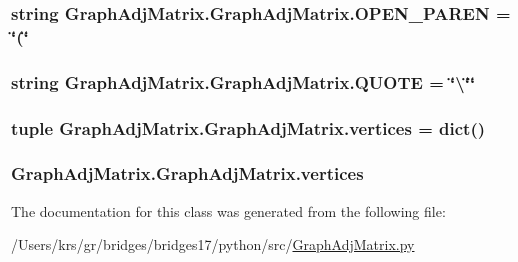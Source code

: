 \subsubsection[{O\+P\+E\+N\+\_\+\+P\+A\+R\+E\+N}]{\setlength{\rightskip}{0pt plus 5cm}string Graph\+Adj\+Matrix.\+Graph\+Adj\+Matrix.\+O\+P\+E\+N\+\_\+\+P\+A\+R\+E\+N = \char`\"{}(\char`\"{}\hspace{0.3cm}{\ttfamily [static]}}\label{class_graph_adj_matrix_1_1_graph_adj_matrix_a0eb8509351b0db9469c5fffe5eddb898}
\hypertarget{class_graph_adj_matrix_1_1_graph_adj_matrix_acd4760c3ebf6789b9f8b1ec13d5394ee}{}
\subsubsection[{Q\+U\+O\+T\+E}]{\setlength{\rightskip}{0pt plus 5cm}string Graph\+Adj\+Matrix.\+Graph\+Adj\+Matrix.\+Q\+U\+O\+T\+E = \char`\"{}\textbackslash{}\char`\"{}\char`\"{}\hspace{0.3cm}{\ttfamily [static]}}\label{class_graph_adj_matrix_1_1_graph_adj_matrix_acd4760c3ebf6789b9f8b1ec13d5394ee}
\hypertarget{class_graph_adj_matrix_1_1_graph_adj_matrix_ab02c8991e3ec38d4f1d277b350fbce4f}{}
\subsubsection[{vertices}]{\setlength{\rightskip}{0pt plus 5cm}tuple Graph\+Adj\+Matrix.\+Graph\+Adj\+Matrix.\+vertices = dict()\hspace{0.3cm}{\ttfamily [static]}}\label{class_graph_adj_matrix_1_1_graph_adj_matrix_ab02c8991e3ec38d4f1d277b350fbce4f}
\hypertarget{class_graph_adj_matrix_1_1_graph_adj_matrix_a85c454d09e82706b00563af339c0147f}{}
\subsubsection[{vertices}]{\setlength{\rightskip}{0pt plus 5cm}Graph\+Adj\+Matrix.\+Graph\+Adj\+Matrix.\+vertices}\label{class_graph_adj_matrix_1_1_graph_adj_matrix_a85c454d09e82706b00563af339c0147f}


The documentation for this class was generated from the following file\+:\begin{DoxyCompactItemize}
\item 
/\+Users/krs/gr/bridges/bridges17/python/src/\hyperlink{_graph_adj_matrix_8py}{Graph\+Adj\+Matrix.\+py}\end{DoxyCompactItemize}
